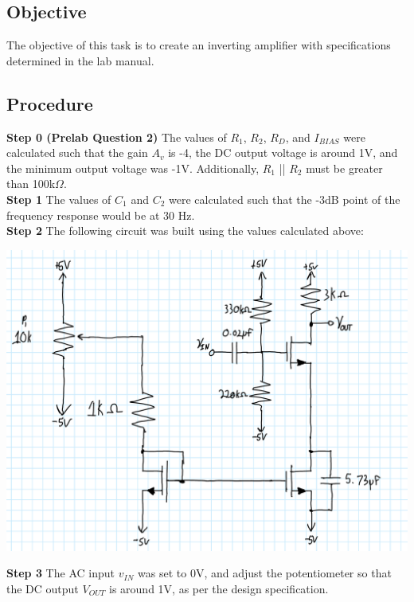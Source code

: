 \documentclass[notitlepage, 12pt]{report}  %
\begin{document}
\subsection*{Objective}
\indent\indent The objective of this task is to create an inverting amplifier with specifications determined in the lab manual. 

\subsection*{Procedure}

\textbf{Step 0 (Prelab Question 2)} 
The values of $R_1$, $R_2$, $R_D$, and $I_{BIAS}$ were calculated such that the gain $A_v$ is -4, the DC output voltage is around 1V, 
and the minimum output voltage was -1V. Additionally, $R_1$ || $R_2$ must be greater than 100k$\Omega$. \\

\textbf{Step 1}
The values of $C_1$ and $C_2$ were calculated such that the -3dB point of the frequency response would be at 30 Hz. \\

\textbf{Step 2}
The following circuit was built using the values calculated above:

\begin{center}
    \includegraphics[scale=0.17]{task2.png}
\end{center}

\textbf{Step 3}
The AC input $v_{IN}$ was set to 0V, and adjust the potentiometer so that the DC output $V_{OUT}$ is around 1V, as per the design specification.\\
\end{document}
